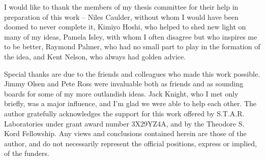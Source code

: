 \begin{acknowledgments}
I would like to thank the members of my thesis committee for their help in preparation of this work -- Niles Caulder, without whom I would have been doomed to never complete it, Kimiyo Hoshi, who helped to shed new light on many of my ideas, Pamela Isley, with whom I often disagree but who inspires me to be better, Raymond Palmer, who had no small part to play in the formation of the idea, and Kent Nelson, who always had golden advice.

Special thanks are due to the friends and colleagues who made this work possible. Jimmy Olsen and Pete Ross were invaluable both as friends and as sounding boards for some of my more outlandish ideas. Jack Knight, who I met only briefly, was a major influence, and I'm glad we were able to help each other. 
The author gratefully acknowledges the support for this work offered by S.T.A.R. Laboratories under grant award number 3X29YZ4A, and by the Theodore S. Kord Fellowship. Any views and conclusions contained herein are those of the author, and do not necessarily represent the official positions, express or implied, of the funders.
\end{acknowledgments}
